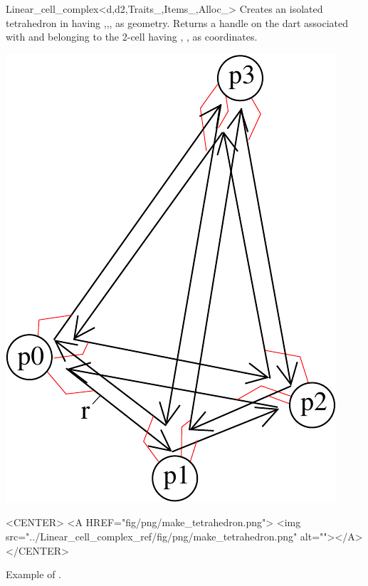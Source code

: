 \begin{ccRefClass}{Linear_cell_complex<d,d2,Traits_,Items_,Alloc_>}
{Creates an isolated tetrahedron in  having  ,,, as geometry.
  Returns a handle on the dart associated with  and
  belonging to the 2-cell having , , 
  as coordinates.
}
%
\def\LargFig{.3\textwidth}
  \begin{ccTexOnly}
    \begin{center}
      \includegraphics[width=\LargFig]{Linear_cell_complex_ref/fig/pdf/make_tetrahedron}
    \end{center}
  \end{ccTexOnly}
  \begin{ccHtmlOnly}
    <CENTER>
    <A HREF="fig/png/make_tetrahedron.png">
        <img src="../Linear_cell_complex_ref/fig/png/make_tetrahedron.png" alt=""></A>
    </CENTER>
    \end{ccHtmlOnly}
    \centerline{Example of .}


\end{ccRefClass}
